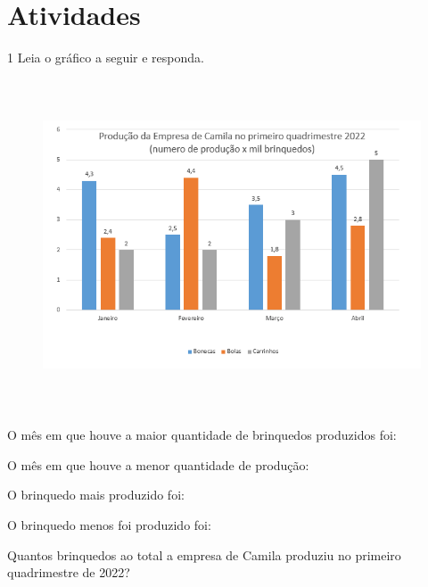 {{\section*{Atividades}

\num{1} Leia o gráfico a seguir e responda.

\begin{figure}[H]
\centering\includegraphics[width=5.90625in,height=3.86458in]{./imgSAEB_8_MAT/media/image39.png}
\end{figure}

\begin{escolha}[itemsep=0pt]
\item O mês em que houve a maior quantidade de brinquedos produzidos foi:
\item O mês em que houve a menor quantidade de produção:
\item O brinquedo mais produzido foi:
\item O brinquedo menos foi produzido foi:
\item Quantos brinquedos ao total a empresa de Camila produziu no primeiro quadrimestre de 2022?
\end{escolha}

\\
\\
\\
\\
\\

}}
